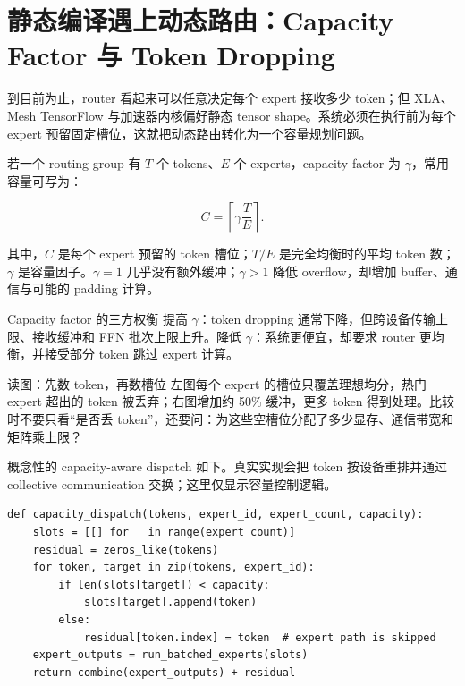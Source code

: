 \section{静态编译遇上动态路由：Capacity Factor 与 Token Dropping}

到目前为止，router 看起来可以任意决定每个 expert 接收多少 token；但 XLA、Mesh TensorFlow 与加速器内核偏好静态 tensor shape。系统必须在执行前为每个 expert 预留固定槽位，这就把动态路由转化为一个容量规划问题。


若一个 routing group 有 $T$ 个 tokens、$E$ 个 experts，capacity factor 为 $\gamma$，常用容量可写为：

\[
C=\left\lceil \gamma\frac{T}{E}\right\rceil.
\]

其中，$C$ 是每个 expert 预留的 token 槽位；$T/E$ 是完全均衡时的平均 token 数；$\gamma$ 是容量因子。$\gamma=1$ 几乎没有额外缓冲；$\gamma>1$ 降低 overflow，却增加 buffer、通信与可能的 padding 计算。

\begin{importantbox}{Capacity factor 的三方权衡}
提高 $\gamma$：token dropping 通常下降，但跨设备传输上限、接收缓冲和 FFN 批次上限上升。降低 $\gamma$：系统更便宜，却要求 router 更均衡，并接受部分 token 跳过 expert 计算。
\end{importantbox}


\begin{knowledgebox}{读图：先数 token，再数槽位}
左图每个 expert 的槽位只覆盖理想均分，热门 expert 超出的 token 被丢弃；右图增加约 50\% 缓冲，更多 token 得到处理。比较时不要只看“是否丢 token”，还要问：为这些空槽位分配了多少显存、通信带宽和矩阵乘上限？
\end{knowledgebox}

概念性的 capacity-aware dispatch 如下。真实实现会把 token 按设备重排并通过 collective communication 交换；这里仅显示容量控制逻辑。

\begin{lstlisting}[caption={带 expert capacity 的 top-1 dispatch 伪代码。}]
def capacity_dispatch(tokens, expert_id, expert_count, capacity):
    slots = [[] for _ in range(expert_count)]
    residual = zeros_like(tokens)
    for token, target in zip(tokens, expert_id):
        if len(slots[target]) < capacity:
            slots[target].append(token)
        else:
            residual[token.index] = token  # expert path is skipped
    expert_outputs = run_batched_experts(slots)
    return combine(expert_outputs) + residual
\end{lstlisting}

